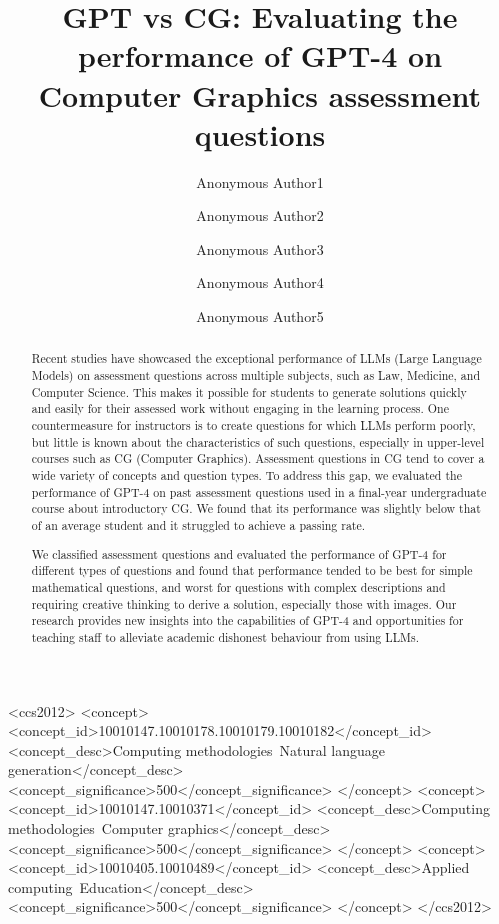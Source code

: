 \documentclass[sigconf,review]{acmart}
\title[GPT vs CG]{GPT vs CG: Evaluating the performance of GPT-4 on Computer Graphics assessment questions}
\author{Anonymous Author1}
\affiliation{
  \institution{Anon Institution}
  \city{Anon City}
  \country{Anon Country}
}
\author{Anonymous Author2}
\affiliation{
  \institution{Anon Institution}
  \city{Anon City}
  \country{Anon Country}
}
\author{Anonymous Author3}
\affiliation{
  \institution{Anon Institution}
  \city{Anon City}
  \country{Anon Country}
}
\author{Anonymous Author4}
\affiliation{
  \institution{Anon Institution}
  \city{Anon City}
  \country{Anon Country}
}
\author{Anonymous Author5}
\affiliation{
  \institution{Anon Institution}
  \city{Anon City}
  \country{Anon Country}
}
\begin{document}
\begin{abstract}
Recent studies have showcased the exceptional performance of LLMs (Large Language Models) on assessment questions across multiple subjects, such as Law, Medicine, and Computer Science. This makes it possible for students to generate solutions quickly and easily for their assessed work without engaging in the learning process. One countermeasure for instructors is to create questions for which LLMs perform poorly, but little is known about the characteristics of such questions, especially in upper-level courses such as CG (Computer Graphics).  Assessment questions in CG tend to cover a wide variety of concepts and question types. To address this gap, we evaluated the performance of GPT-4 on past assessment questions used in a final-year undergraduate course about introductory CG. We found that its performance was slightly below that of an average student and it struggled to achieve a passing rate.

We classified assessment questions and evaluated the performance of GPT-4 for different types of questions and found that performance tended to be best for simple mathematical questions, and worst for questions with complex descriptions and requiring creative thinking to derive a solution, especially those with images. Our research provides new insights into the capabilities of GPT-4 and opportunities for teaching staff to alleviate academic dishonest behaviour from using LLMs.
\end{abstract}

\begin{CCSXML}
<ccs2012>
   <concept>
       <concept_id>10010147.10010178.10010179.10010182</concept_id>
       <concept_desc>Computing methodologies~Natural language generation</concept_desc>
       <concept_significance>500</concept_significance>
       </concept>
   <concept>
       <concept_id>10010147.10010371</concept_id>
       <concept_desc>Computing methodologies~Computer graphics</concept_desc>
       <concept_significance>500</concept_significance>
       </concept>
   <concept>
       <concept_id>10010405.10010489</concept_id>
       <concept_desc>Applied computing~Education</concept_desc>
       <concept_significance>500</concept_significance>
       </concept>
 </ccs2012>
\end{CCSXML}

\end{document}
